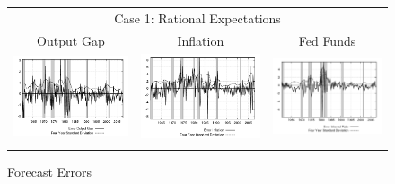 \begin{figure}
\caption{Forecast Errors}\label{fg:fe}\vspace*{1pc}
\begin{tabular}{ccc}
\multicolumn{3}{c}{Case 1: Rational Expectations} \\ 
Output Gap & Inflation & Fed Funds \\
\includegraphics[scale=0.28]{results_re/output_err.png} & 
\includegraphics[scale=0.28]{results_re/inflation_err.png} & 
\includegraphics[scale=0.28]{results_re/fedfunds_err.png} \\ \\ 
 

\end{tabular}
\end{figure}
